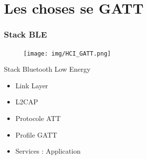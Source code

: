 \section{Les choses se GATT}

\begin{frame}
	\frametitle{Stack BLE}
	\begin{minipage}{0.45\linewidth}
		\begin{figure}
			\texttt{[image: img/HCI\_GATT.png]}
		\end{figure}
	\end{minipage}
	\begin{minipage}{0.50\linewidth}
		\begin{block}{Stack Bluetooth Low Energy}
			\begin{itemize}
				\item Link Layer
				\item L2CAP
				\item Protocole ATT
				\item Profile GATT
				\item Services : Application
			\end{itemize}
		\end{block}
	\end{minipage}
\end{frame}

